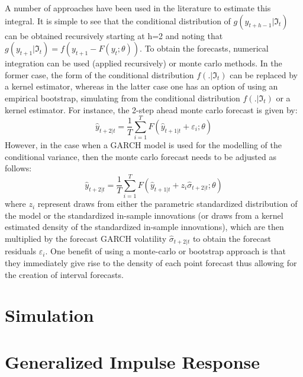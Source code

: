 A number of approaches have been used in the literature to estimate this
integral. It is simple to see that the conditional distribution of ${g\left(
{{y_{t + h - 1}}\left| {{\Im _t}} \right.} \right)}$ can be obtained recursively
starting at h=2 and noting that $g\left( {{y_{t + 1}}\left| {{\Im _t}} \right.}
\right) = f\left( {{y_{t + 1}} - F\left( {{y_t};\theta } \right)} \right)$. To
obtain the forecasts, numerical integration can be used (applied recursively) or
monte carlo methods. In the former case, the form of the conditional
distribution $f\left( {.\left| {{\Im _t}} \right.} \right)$ can be replaced by a
kernel estimator, whereas in the latter case one has an option of using an
empirical  bootstrap, simulating from the conditional distribution $f\left(
{.\left| {{\Im _t}} \right.} \right)$ or a kernel estimator.  For instance,  
the 2-step ahead monte carlo forecast is given by:
\begin{equation}
{{\hat y}_{t + 2\left| t \right.}} = \frac{1}{T}\sum\limits_{i = 1}^T {F\left( {{{\hat y}_{t + 1\left| t \right.}} + {\varepsilon _i};\theta } \right)}
\end{equation}
However, in the case when a GARCH model is used for the modelling of the
conditional variance, then the monte carlo forecast needs to be adjusted as follows:
\begin{equation}
{{\hat y}_{t + 2\left| t \right.}} = \frac{1}{T}\sum\limits_{i = 1}^T {F\left( {{{\hat y}_{t + 1\left| t \right.}} + {z_i}{{\hat \sigma }_{t + 2\left| t \right.}};\theta } \right)}
\end{equation}
where $z_i$ represent draws from either the parametric standardized distribution
of the model  or the standardized in-sample innovations (or draws from a kernel
estimated density of the standardized in-sample innovations), which are then
multiplied  by the forecast GARCH volatility ${{{\hat \sigma }_{t + 2\left| t
\right.}}}$ to obtain the forecast residuals $\varepsilon_i$.
One benefit of using a monte-carlo or bootstrap approach is that they
immediately give rise to the density of each point forecast thus allowing  for
the creation of interval forecasts.

\section{Simulation}\label{sec:3}

\section{Generalized Impulse Response}\label{sec:4}

